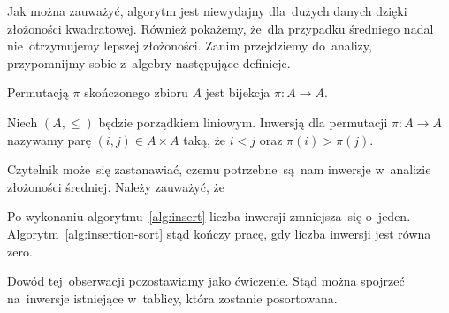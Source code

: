 Jak można zauważyć, algorytm jest niewydajny dla~dużych
danych dzięki złożoności kwadratowej. Również pokażemy,
że~dla przypadku średniego nadal nie~otrzymujemy
lepszej złożoności. Zanim przejdziemy do~analizy,
przypomnijmy sobie z~algebry następujące definicje.

\begin{definition}
    Permutacją \( \pi \) skończonego zbioru \( A \)
    jest bijekcja \( \pi : A \to A \).
\end{definition}

\begin{definition}
    Niech \( (A, \le) \) będzie porządkiem liniowym.
    Inwersją dla permutacji \( \pi : A \to A \) 
    nazywamy parę \( (i, j) \in A \times A \)
    taką, że \( i < j \) oraz \( \pi(i) > \pi(j) \).
\end{definition}

Czytelnik może~się zastanawiać, czemu potrzebne~są~nam 
inwersje w~analizie złożoności średniej.
Należy zauważyć, że 
\begin{observation}
    Po wykonaniu algorytmu~\ref{alg:insert} 
    liczba inwersji zmniejsza~się o~jeden.
    Algorytm~\ref{alg:insertion-sort}
    stąd kończy pracę, gdy liczba inwersji
    jest równa zero.
\end{observation}      
Dowód tej~obserwacji pozostawiamy jako ćwiczenie.
Stąd można spojrzeć na~inwersje istniejące w~tablicy,
która zostanie posortowana.

